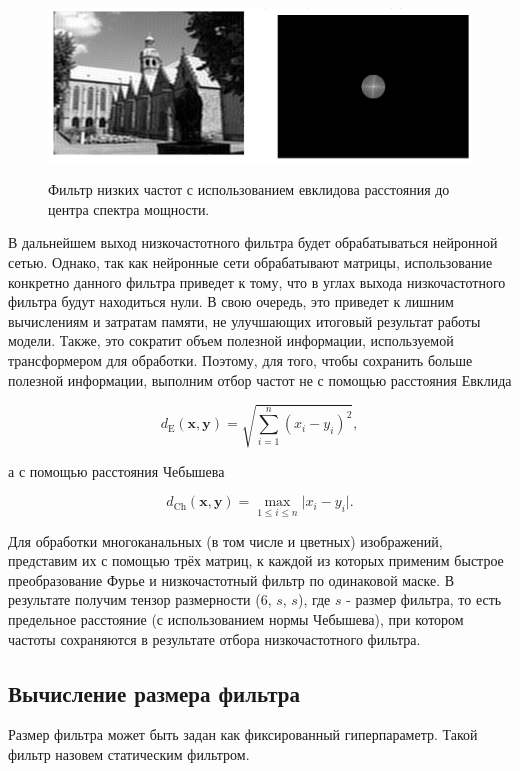 \documentclass[times,specification,annotation]{itmo-student-thesis}
\begin{document}
\begin{figure}[H]
    \centering
    \includegraphics[width=1.0\textwidth]
    {images/solutions_analysis/fourier/low_pass_filter.png}
    \label{fig:svd_approx_im_fix_rank}
    \caption{Фильтр низких частот с использованием евклидова расстояния до центра спектра мощности.}
\end{figure}

В дальнейшем выход низкочастотного фильтра будет обрабатываться нейронной сетью. Однако, так как нейронные сети обрабатывают матрицы, использование конкретно данного фильтра приведет к тому, что в углах выхода низкочастотного фильтра будут находиться нули. В свою очередь, это приведет к лишним вычислениям и затратам памяти, не улучшающих итоговый результат работы модели. Также, это сократит объем полезной информации, используемой трансформером для обработки. Поэтому, для того, чтобы сохранить больше полезной информации, выполним отбор частот не с помощью расстояния Евклида

$$
d_{\mathrm{E}}(\mathbf{x}, \mathbf{y})
= \sqrt{\sum_{i=1}^{n} (x_i - y_i)^2},
$$

а с помощью расстояния Чебышева

$$
d_{\mathrm{Ch}}(\mathbf{x}, \mathbf{y})
= \max_{1 \le i \le n} \bigl|x_i - y_i\bigr|.
$$


Для обработки многоканальных (в том числе и цветных) изображений, представим их с помощью трёх матриц, к каждой из которых применим быстрое преобразование Фурье и низкочастотный фильтр по одинаковой маске. В результате получим тензор размерности (6, $s$, $s$), где $s$ - размер фильтра, то есть предельное расстояние (с использованием нормы Чебышева), при котором частоты сохраняются в результате отбора низкочастотного фильтра.

\subsection{Вычисление размера фильтра}
Размер фильтра может быть задан как фиксированный гиперпараметр. Такой фильтр назовем статическим фильтром.
\end{document}
